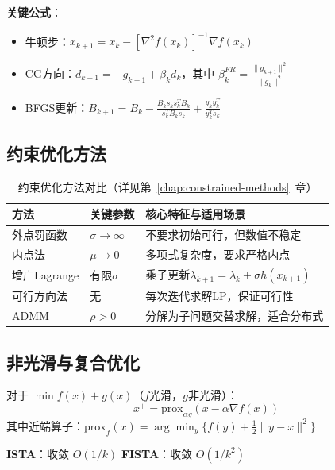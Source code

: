 \textbf{关键公式}：
\begin{itemize}
    \item 牛顿步：$x_{k+1} = x_k - [\nabla^2 f(x_k)]^{-1} \nabla f(x_k)$
    \item CG方向：$d_{k+1} = -g_{k+1} + \beta_k d_k$，其中 $\beta_k^{FR} = \frac{\|g_{k+1}\|^2}{\|g_k\|^2}$
    \item BFGS更新：$B_{k+1} = B_k - \frac{B_k s_k s_k^T B_k}{s_k^T B_k s_k} + \frac{y_k y_k^T}{y_k^T s_k}$
\end{itemize}

\subsection{约束优化方法}

\begin{table}[H]
\centering
\small
\caption{约束优化方法对比（详见第~\ref{chap:constrained-methods}~章）}\label{tab:constrained}
\begin{tabular}{@{}>{\raggedright\arraybackslash}p{2.5cm}>{\raggedright\arraybackslash}p{2.5cm}>{\raggedright\arraybackslash}p{7cm}@{}}
\toprule
\textbf{方法} & \textbf{关键参数} & \textbf{核心特征与适用场景} \\
\midrule
外点罚函数 & $\sigma \to \infty$ & 不要求初始可行，但数值不稳定 \\
内点法 & $\mu \to 0$ & 多项式复杂度，要求严格内点 \\
增广Lagrange & 有限$\sigma$ & 乘子更新$\lambda_{k+1} = \lambda_k + \sigma h(x_{k+1})$ \\
可行方向法 & 无 & 每次迭代求解LP，保证可行性 \\
ADMM & $\rho > 0$ & 分解为子问题交替求解，适合分布式 \\
\bottomrule
\end{tabular}
\end{table}

\subsection{非光滑与复合优化}

\begin{conceptbox}[近端梯度法]
对于 $\min f(x) + g(x)$（$f$光滑，$g$非光滑）：
\[
x^+ = \text{prox}_{\alpha g}(x - \alpha \nabla f(x))
\]
其中近端算子：$\text{prox}_f(x) = \arg\min_y \{f(y) + \frac{1}{2}\|y-x\|^2\}$

\textbf{ISTA}：收敛 $O(1/k)$ \quad \textbf{FISTA}：收敛 $O(1/k^2)$
\end{conceptbox}

